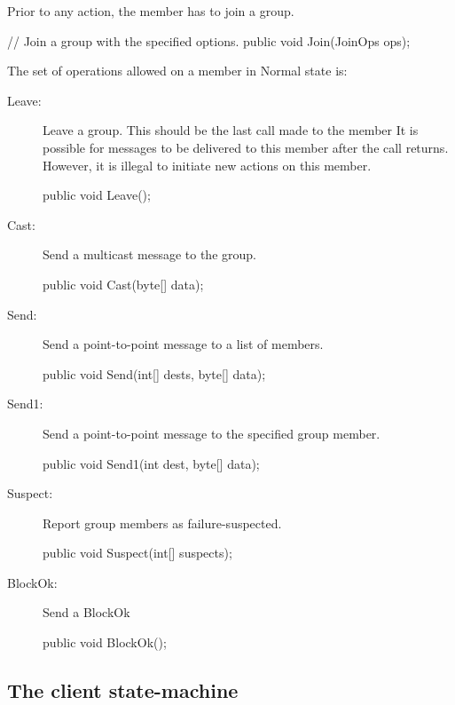 \begin{description}
  Prior to any action, the member has to join a group.
  \begin{codebox}
  // Join a group with the specified options. 
  public void Join(JoinOps ops);
  \end{codebox}
  
  The set of operations allowed on a member in Normal state is:
  \begin{description}
  \item[Leave:] Leave a group. This should be the last call made to the member
    It is possible for messages to be delivered to this member after the call
    returns. However, it is illegal to initiate new actions on this member.
    \begin{codebox}
      public void Leave();
    \end{codebox}
    
  \item[Cast:]
    Send a multicast message to the group.
    \begin{codebox}
      public void Cast(byte[] data);
    \end{codebox}
    
  \item[Send:]
    Send a point-to-point message to a list of members.
    \begin{codebox}
      public void Send(int[] dests, byte[] data);
    \end{codebox}
    
  \item[Send1:]
    Send a point-to-point message to the specified group member.
    \begin{codebox}
      public void Send1(int dest, byte[] data);
    \end{codebox}
    
  \item[Suspect:]
    Report group members as failure-suspected.
    \begin{codebox}
      public void Suspect(int[] suspects);
    \end{codebox}
    
  \item[BlockOk:]
    Send a BlockOk
    \begin{codebox}
      public void BlockOk();
    \end{codebox}
  \end{description}
\end{description}


\subsection{The client state-machine}

